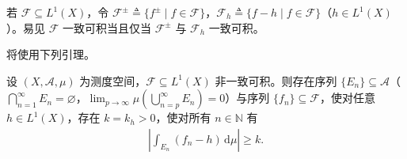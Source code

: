 \documentclass[../../main.tex]{subfiles}%
\begin{document}
\begin{remark}\label{remark:ch02-正负一致可积}
若 $\mathscr F\subseteq L^1(X)$，令 $\mathscr F^\pm\triangleq \{f^\pm\mid f\in\mathscr F\}$，$\mathscr F_h\triangleq \{f-h\mid f\in\mathscr F\}$（$h\in L^1(X)$）。易见 $\mathscr F$ 一致可积当且仅当 $\mathscr F^\pm$ 与 $\mathscr F_h$ 一致可积。
\end{remark}

将使用下列引理。

\begin{lemma}\label{lemma:ch02-非一致可积}
设 $(X,\mathscr A,\mu)$ 为测度空间，$\mathscr F\subseteq L^1(X)$ 非一致可积。则存在序列 $\{E_n\}\subseteq\mathscr A$（$\bigcap_{n=1}^\infty E_n=\varnothing $，$\lim_{p\to\infty}\mu(\bigcup_{n=p}^\infty E_n)=0$）与序列 $\{f_n\}\subseteq\mathscr F$，使对任意 $h\in L^1(X)$，存在 $k=k_h>0$，使对所有 $n\in\mathbb N$ 有
\begin{align}
\left|\int_{E_n}(f_n-h)\,\mathrm{d}\mu\right|\geqslant k. \label{align:ch02-2.58}
\end{align}
\end{lemma}
\end{document}
